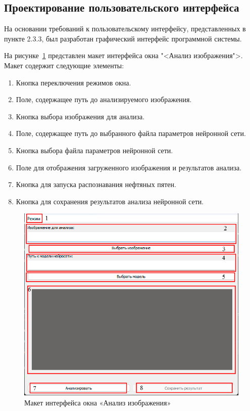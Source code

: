 \subsection{Проектирование пользовательского интерфейса}

На основании требований к пользовательскому интерфейсу, представленных в пункте 2.3.3, был разработан графический интерфейс программной системы. 

На рисунке~\ref{fig:uianalysis} представлен макет интерфейса окна "<Анализ изображения">. Макет содержит следующие элементы:

\begin{enumerate}
	\item Кнопка переключения режимов окна.
	\item Поле, содержащее путь до анализируемого изображения.
	\item Кнопка выбора изображения для анализа.
	\item Поле, содержащее путь до выбранного файла параметров нейронной сети.
	\item Кнопка выбора файла параметров нейронной сети.
	\item Поле для отображения загруженного изображения и результатов анализа.
	\item Кнопка для запуска распознавания нефтяных пятен. 
	\item Кнопка для сохранения результатов анализа нейронной сети.
\end{enumerate}

\begin{figure}[H]
	\centering
	\includegraphics[width=0.7\linewidth]{images/ui_analysis}
	\caption{Макет интерфейса окна «Анализ изображения»}
	\label{fig:uianalysis}
\end{figure}

